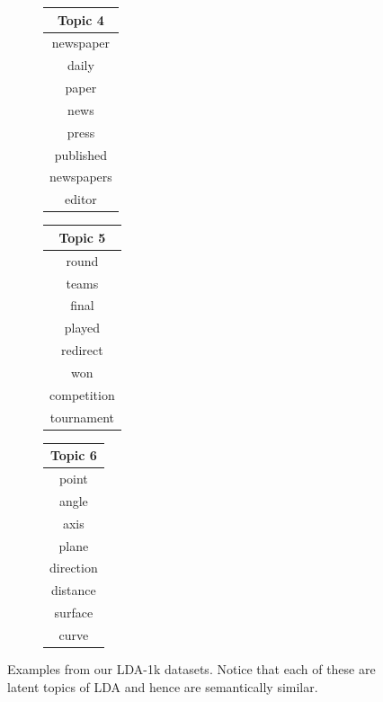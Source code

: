 \documentclass{article}
\begin{document}
\begin{figure}[ht]
\begin{subfigure}[b]{0.15\textwidth}
    \centering
    \begin{tabular}[b]{c}
    \textbf{Topic 4} \\ \hline
       newspaper   \\
       daily   \\
       paper   \\
       news   \\
       press   \\
       published   \\
       newspapers   \\
       editor   \\
    \end{tabular}
    \end{subfigure}
    \begin{subfigure}[b]{0.15\textwidth}
    \centering
    \begin{tabular}[b]{c}
     \textbf{Topic 5} \\ \hline
       round   \\
       teams   \\
       final   \\
       played   \\
       redirect   \\
       won   \\
       competition   \\
       tournament   \\
    \end{tabular}
    \end{subfigure}       
    \begin{subfigure}[b]{0.15\textwidth}
    \centering
    \begin{tabular}[b]{c}
     \textbf{Topic 6} \\ \hline
       point   \\
       angle   \\
       axis   \\
       plane   \\
       direction   \\
       distance   \\
       surface   \\
       curve   \\
    \end{tabular}
    \end{subfigure}
    \caption{\small Examples from our LDA-1k datasets. Notice that each of these are latent topics of LDA and hence are semantically similar.}
    \label{tab:lda-qual-examples}
    \vspace{-6mm}
\end{figure}
\end{document}
